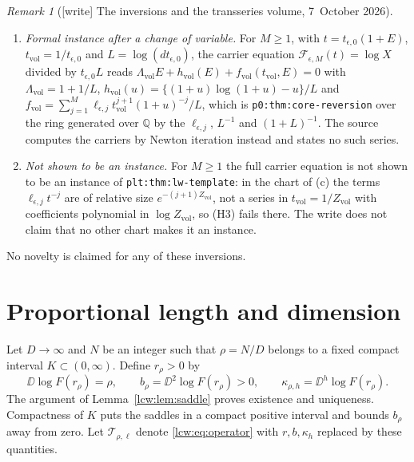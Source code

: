\documentclass[11pt,letterpaper]{article}
\theoremstyle{remark}\newtheorem{remark}[theorem]{Remark}
\newcommand{\TT}{\mathcal T}\newcommand{\PP}{\mathcal P}
\newcommand{\file}[1]{\nolinkurl{#1}}
\begin{document}
\begin{remark}[{[write]} The inversions and the transseries volume, 7~October 2026]
\begin{enumerate}[label=(\alph*)]
 \file{p0:prop:factorial-core} with $\kappa_{\mathrm{vol}}=1$,
 $d_{\mathrm{vol}}=\log d$ and $L_{\mathrm{vol}}=Y_\epsilon$: there
 $v=W_0(dY_\epsilon)$ and $X_{\mathrm{vol}}=e^{v}/d=Y_\epsilon/v$, with the side
 condition $dt>1$; the displacement $t_{\epsilon,0}-t_\ast$ is the first-order
 term given by the core's slope $1/(\kappa_{\mathrm{vol}}(v+1))=1/(1+\log(dt))$.
 Its large-$Y$ expansion is a \emph{formal} instance of
 \file{plt:thm:lw-template} with $Z_{\mathrm{vol}}=\log t$,
 $\xi_{\mathrm{vol}}=\log Y_\epsilon$ and data
 $(\rho_{\mathrm{vol}},\mu_{\mathrm{vol}},\beta_{\mathrm{vol}},B_{\mathrm{vol}})=(1,1,0,\log(1+t_{\mathrm{vol}}\log d))$,
 since $\log(t\log(dt))=Z_{\mathrm{vol}}+\log Z_{\mathrm{vol}}+\log(1+\log d/Z_{\mathrm{vol}})$.
\item \emph{Formal instance after a change of variable.} For $M\ge1$, with
 $t=t_{\epsilon,0}(1+E)$, $t_{\mathrm{vol}}=1/t_{\epsilon,0}$ and
 $L=\log(dt_{\epsilon,0})$, the carrier equation
 $\mathcal F_{\epsilon,M}(t)=\log X$ divided by $t_{\epsilon,0}L$ reads
 $\Lambda_{\mathrm{vol}}E+h_{\mathrm{vol}}(E)+f_{\mathrm{vol}}(t_{\mathrm{vol}},E)=0$
 with $\Lambda_{\mathrm{vol}}=1+1/L$,
 $h_{\mathrm{vol}}(u)=\{(1+u)\log(1+u)-u\}/L$ and
 $f_{\mathrm{vol}}=\sum_{j=1}^M\ell_{\epsilon,j}t_{\mathrm{vol}}^{j+1}(1+u)^{-j}/L$,
 which is \file{p0:thm:core-reversion} over the ring generated over $\mathbb Q$
 by the $\ell_{\epsilon,j}$, $L^{-1}$ and $(1+L)^{-1}$. The source computes the
 carriers by Newton iteration instead and states no such series.
\item \emph{Not shown to be an instance.} For $M\ge1$ the full carrier
 equation is not shown to be an instance of \file{plt:thm:lw-template}: in the
 chart of (c) the terms $\ell_{\epsilon,j}t^{-j}$ are of relative size
 $e^{-(j+1)Z_{\mathrm{vol}}}$, not a series in $t_{\mathrm{vol}}=1/Z_{\mathrm{vol}}$
 with coefficients polynomial in $\log Z_{\mathrm{vol}}$, so (H3) fails there.
 The write does not claim that no other chart makes it an instance.
\end{enumerate}
No novelty is claimed for any of these inversions.
\end{remark}

\section{Proportional length and dimension}\label{lcw:sec:ratio}
Let $D\to\infty$ and $N$ be an integer such that $\rho=N/D$ belongs to a fixed compact interval $K\subset(0,\infty)$. Define $r_\rho>0$ by
\[
 \DD\log F(r_\rho)=\rho,\qquad b_\rho=\DD^2\log F(r_\rho)>0,
 \qquad\kappa_{\rho,h}=\DD^h\log F(r_\rho).
\]
The argument of Lemma~\ref{lcw:lem:saddle} proves existence and uniqueness. Compactness of $K$ puts the saddles in a compact positive interval and bounds $b_\rho$ away from zero. Let $\TT_{\rho,\ell}$ denote \eqref{lcw:eq:operator} with $r,b,\kappa_h$ replaced by these quantities.
\end{document}
